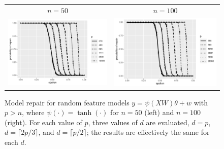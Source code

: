 \begin{figure}[ht]
  \begin{center}
    \begin{tabular}{cc}
      {\scriptsize $n=50$} & {\scriptsize $n=100$} \\
      \includegraphics[width=.47\textwidth]{fig/plot-rf-50} &
      \includegraphics[width=.47\textwidth]{fig/plot-rf-100}\\[-10pt]
    \end{tabular}
  \end{center}
\caption{Model repair for random feature models $y=\psi(XW)\theta + w$ with $p>n$, where $\psi(\cdot) = \tanh(\cdot)$
for $n=50$ (left) and $n=100$ (right). For each value of $p$, three values of $d$ are evaluated, $d=p$, $d=\lceil 2p/3\rceil$,
and $d=\lceil p/2\rceil$; the results are effectively the same for each $d$.}
\label{fig:rf}
\end{figure}
